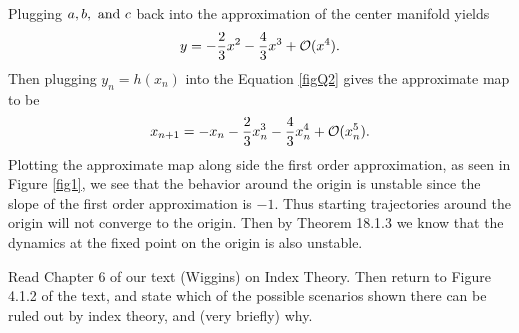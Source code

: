 \documentclass[12pt]{report}
\begin{document}
\begin{solution}
    Plugging $a, b, {~\text{and}~} c$ back into the approximation of the center manifold yields
    \[ 
        y = -\frac{2}{3}x^2 - \frac{4}{3}x^3 + {\mathcal{O}}(x^4).
    \]
    Then plugging $y_n = h(x_n)$ into the Equation \ref{figQ2} gives the approximate map to be 
    \begin{equation*}
            x_{n+1} = -x_n -\frac{2}{3}x_n^3 - \frac{4}{3}x_n^4 + {\mathcal{O}}(x_n^5).
    \end{equation*}
    Plotting the approximate map along side the first order approximation, as seen in Figure \ref{fig1}, we see that the behavior around the origin is unstable since the slope of the first order approximation is $-1$. Thus starting trajectories around the origin will not converge to the origin. Then by Theorem 18.1.3 we know that the dynamics at the fixed point on the origin is also unstable. 


\end{solution}

\newpage




\begin{problem}
    Read Chapter 6 of our text (Wiggins) on Index Theory.  Then return to Figure 4.1.2 of the text, and state which of the possible scenarios shown there can be ruled out by index theory, and (very briefly) why.
\end{problem}
\end{document}
